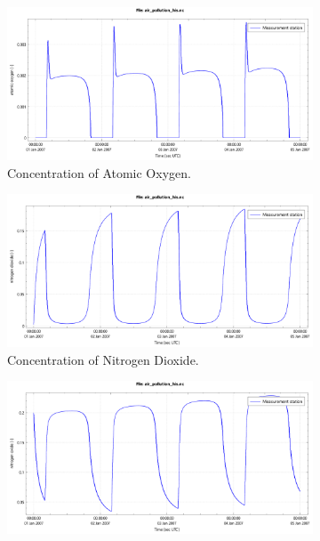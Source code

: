 \begin{figure}[H]
    \begin{subfigure}{0.5\textwidth}
        \includegraphics[width=\textwidth]{figures/atomic_oxygen_dt0d5.pdf}
        \caption{Concentration of Atomic Oxygen.}
    \end{subfigure}
    \begin{subfigure}{0.5\textwidth}
        \includegraphics[width=\textwidth]{figures/nitrogen_dioxide_dt0d5.pdf}
        \caption{Concentration of Nitrogen Dioxide.}
    \end{subfigure}
    \begin{subfigure}{0.5\textwidth}
        \includegraphics[width=\textwidth]{figures/nitrogen_oxide_dt0d5.pdf}

\end{subfigure}
\end{figure}

